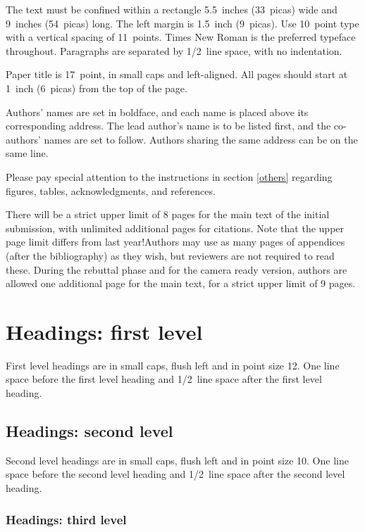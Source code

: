 \documentclass{article}
\begin{document}
The text must be confined within a rectangle 5.5~inches (33~picas) wide and
9~inches (54~picas) long. The left margin is 1.5~inch (9~picas).
Use 10~point type with a vertical spacing of 11~points. Times New Roman is the
preferred typeface throughout. Paragraphs are separated by 1/2~line space,
with no indentation.

Paper title is 17~point, in small caps and left-aligned.
All pages should start at 1~inch (6~picas) from the top of the page.

Authors' names are
set in boldface, and each name is placed above its corresponding
address. The lead author's name is to be listed first, and
the co-authors' names are set to follow. Authors sharing the
same address can be on the same line.

Please pay special attention to the instructions in section \ref{others}
regarding figures, tables, acknowledgments, and references.


There will be a strict upper limit of 8 pages for the main text of the initial submission, with unlimited additional pages for citations. Note that the upper page limit differs from last year!Authors may use as many pages of appendices (after the bibliography) as they wish, but reviewers are not required to read these. During the rebuttal phase and for the camera ready version, authors are allowed one additional page for the main text, for a strict upper limit of 9 pages.

\section*{Headings: first level}
\label{headings}

First level headings are in small caps,
flush left and in point size 12. One line space before the first level
heading and 1/2~line space after the first level heading.

\subsection*{Headings: second level}

Second level headings are in small caps,
flush left and in point size 10. One line space before the second level
heading and 1/2~line space after the second level heading.

\subsubsection*{Headings: third level}
\end{document}
